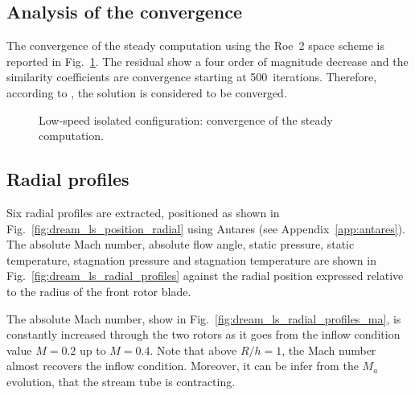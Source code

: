 
\subsection{Analysis of the convergence}
\label{sub:dream_ls_conv_coeff}

The convergence of the steady computation using the Roe~2 space scheme
is reported in Fig.~\ref{fig:dream_ls_convergence_roe2}. The residual
show a four order of magnitude decrease and the similarity
coefficients are convergence starting at 500~iterations.
Therefore, according to \citet{Casey2000}, the
solution is considered to be converged.
\begin{figure}[htb]
  \centering
  \caption{Low-speed isolated configuration: convergence of the steady
  computation.}
  \label{fig:dream_ls_convergence_roe2}
\end{figure}

\subsection{Radial profiles}
\label{sub:dream_ls_radial_profiles}

Six radial profiles are extracted,
positioned as shown in Fig.~\ref{fig:dream_ls_position_radial}
using Antares (see Appendix~\ref{app:antares}). The absolute
Mach number, absolute flow angle, static pressure, static
temperature, stagnation pressure and stagnation temperature
are shown in Fig.~\ref{fig:dream_ls_radial_profiles}
against the radial position expressed
relative to the radius of the front rotor blade.

The absolute Mach number, show in 
Fig.~\ref{fig:dream_ls_radial_profiles_ma}, is constantly increased through
the two rotors as it goes from the inflow condition value $M=0.2$
up to $M=0.4$. Note that above $R/h=1$, the Mach number
almost recovers the inflow condition. Moreover, it can be infer from the
$M_a$ evolution, that the stream tube is contracting.

